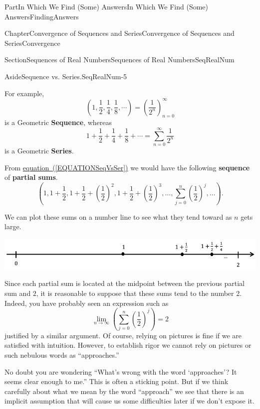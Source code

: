 \documentclass[oneside,10pt,]{book}
\newcommand{\xreffont}{\relax}
\newcommand{\terminology}[1]{\textbf{#1}}
\numberwithin{equation}{part}
\def\limit#1#2#3{{\displaystyle\lim_{#1\rightarrow #2}#3}}
\begin{document}
\begin{partptx}{Part}{In Which We Find (Some) Answers}{}{In Which We Find (Some) Answers}{}{}{FindingAnswers}
\begin{chapterptx}{Chapter}{Convergence of Sequences and Series}{}{Convergence of Sequences and Series}{}{}{Convergence}
\begin{sectionptx}{Section}{Sequences of Real Numbers}{}{Sequences of Real Numbers}{}{}{SeqRealNum}
\begin{aside}{Aside}{Sequence vs. Series.}{SeqRealNum-5}
\par
For  example,%
\begin{equation*}
\left(1,\frac{1}{2}, \frac{1}{4}, \frac{1}{8},\cdots \right) =
\left(\frac{1}{2^n}\right)_{n=0}^\infty
\end{equation*}
is a Geometric \terminology{Sequence}, whereas%
\begin{equation*}
1+\frac{1}{2}+ \frac{1}{4}+ \frac{1}{8} + \cdots =
\sum_{n=0}^\infty \frac{1}{2^n}
\end{equation*}
is a Geometric \terminology{Series}.%
\end{aside}
From \hyperref[EQUATIONSeqVsSer]{equation~({\xreffont\ref{EQUATIONSeqVsSer}})} we would have the following \terminology{sequence} of \terminology{partial sums}.%
\begin{equation*}
\left(1,1+\frac{1}{2},1+\frac{1}{2}+\left(\frac{1}{2}\right)^2,1+
\frac{1}{2}+\left(\frac{1}{2}\right)^3,\ldots,\sum_{j=0}^n\left(\frac{1}{2}
\right)^j,\ldots\right) \text{.}
\end{equation*}
%
\par
We can plot these sums on a number line to see what they tend toward as \(n\) gets large.%
\begin{image}{0.08}{0.84}{0.08}{}%
\includegraphics[width=\linewidth]{external/images/NumberLine.png}
\end{image}%
Since each partial sum is located at the midpoint between the previous partial sum and \(2\), it is reasonable to suppose that these sums tend to the number 2.  Indeed, you have probably seen an expression such as%
\begin{equation*}
\limit{n}{\infty}{\left(\sum_{j=0}^n\left(\frac{1}{2}\right)^j\right)}=2
\end{equation*}
justified by a similar argument.  Of course, relying on pictures is fine if we are satisfied with intuition.  However, to establish rigor we cannot rely on pictures or such nebulous words as ``approaches.''%
\par
No doubt you are wondering ``What's wrong with the word `approaches'?  It seems clear enough to me.'' This is often a sticking point.  But if we think carefully about what we mean by the word ``approach'' we see that there is an implicit assumption that will cause us some difficulties later if we don't expose it.%
\par

\end{sectionptx}
\end{chapterptx}
\end{partptx}
\end{document}
